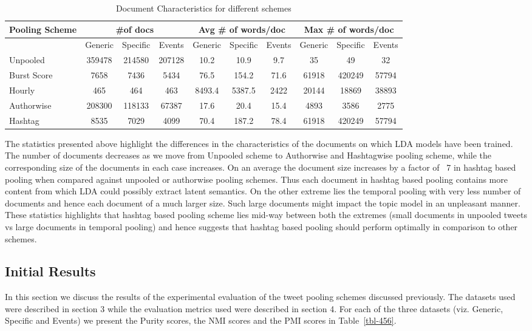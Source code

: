 \documentclass[10pt,a5paper,twoside]{article}
\begin{document}
\begin{table}[!h]
\centering
\resizebox{14cm}{!} 
{
	\begin{tabular}{|l|ccc|ccc|ccc|}
	\hline
	Pooling Scheme  & \multicolumn {3}{c}{\#of docs} & \multicolumn {3}{c}{Avg \# of words/doc} & \multicolumn {3}{c|}{Max \# of words/doc}\\
	\hline
	 & Generic & Specific & Events &  Generic & Specific & Events &  Generic & Specific & Events\\
	\hline
	Unpooled & 359478 & 214580 & 207128 & 10.2 & 10.9 & 9.7 & 35 & 49 & 32 \\
	\hline
	Burst Score & 7658 & 7436 & 5434 & 76.5 & 154.2 & 71.6 & 61918 & 420249 & 57794 \\
	\hline
	Hourly & 465 & 464 & 463 & 8493.4 & 5387.5 & 2422 & 20144 & 18869 & 38893 \\
	\hline
	Authorwise & 208300 & 118133 & 67387 & 17.6 & 20.4 & 15.4 & 4893 & 3586 & 2775 \\
	\hline
	Hashtag & 8535 & 7029 & 4099 & 70.4 & 187.2 & 78.4 & 61918 & 420249 & 57794 \\
	\hline
	\end{tabular}
}
\caption{Document Characteristics for different schemes}\label{tbl-3}
\end{table}

The statistics presented above highlight the differences in the characteristics of the documents on which LDA models have been trained. The number of documents decreases as we move from Unpooled scheme to Authorwise and Hashtagwise pooling scheme, while the corresponding size of the documents in each case increases. On an average the document size increases by a factor of ~7 in hashtag based pooling when compared against unpooled or authorwise pooling schemes. Thus each document in hashtag based pooling contains more content from which LDA could possibly extract latent semantics. On the other extreme lies the temporal pooling with very less number of documents and hence each document of a much larger size. Such large documents might impact the topic model in an unpleasant manner. These statistics highlights that hashtag based pooling scheme lies mid-way between both the extremes (small documents in unpooled tweets vs large documents in temporal pooling) and hence suggests that hashtag based pooling should perform optimally in comparison to other schemes.

\subsection{Initial Results}
In this section we discuss the results of the experimental evaluation of the tweet pooling schemes discussed previously. The datasets used were described in section 3 while the evaluation metrics used were described in section 4. For each of the three datasets (viz. Generic, Specific and Events) we present the Purity scores, the NMI scores and the PMI scores in Table~\ref{tbl-456}. 
\\
\end{document}
